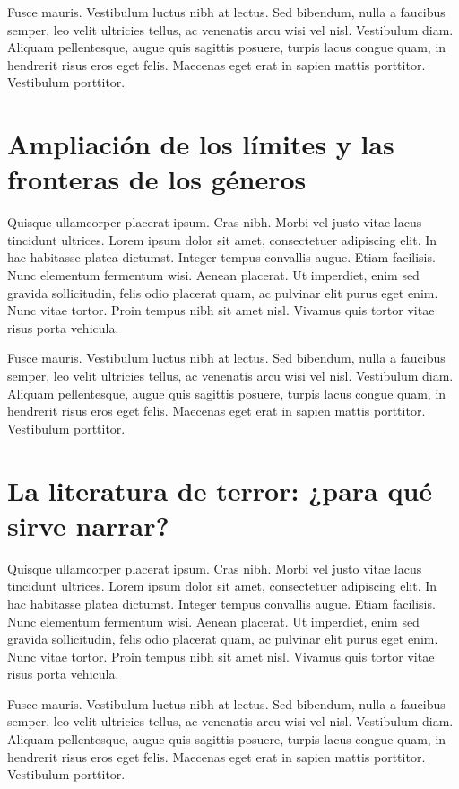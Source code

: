 Fusce mauris. Vestibulum luctus nibh at lectus. Sed bibendum, nulla a faucibus semper, leo velit ultricies tellus, ac venenatis arcu wisi vel nisl. Vestibulum diam. Aliquam pellentesque, augue quis sagittis posuere, turpis lacus congue quam, in hendrerit risus eros eget felis. Maecenas eget erat in sapien mattis porttitor. Vestibulum porttitor.

\section{Ampliación de los límites y las fronteras de los géneros}

Quisque ullamcorper placerat ipsum. Cras nibh. Morbi vel justo vitae lacus tincidunt ultrices. Lorem ipsum dolor sit amet, consectetuer adipiscing elit. In hac habitasse platea dictumst. Integer tempus convallis augue. Etiam facilisis. Nunc elementum fermentum wisi. Aenean placerat. Ut imperdiet, enim sed gravida sollicitudin, felis odio placerat quam, ac pulvinar elit purus eget enim. Nunc vitae tortor. Proin tempus nibh sit amet nisl. Vivamus quis tortor vitae risus porta vehicula.

Fusce mauris. Vestibulum luctus nibh at lectus. Sed bibendum, nulla a faucibus semper, leo velit ultricies tellus, ac venenatis arcu wisi vel nisl. Vestibulum diam. Aliquam pellentesque, augue quis sagittis posuere, turpis lacus congue quam, in hendrerit risus eros eget felis. Maecenas eget erat in sapien mattis porttitor. Vestibulum porttitor.

\section{La literatura de terror: ¿para qué sirve narrar?}

Quisque ullamcorper placerat ipsum. Cras nibh. Morbi vel justo vitae lacus tincidunt ultrices. Lorem ipsum dolor sit amet, consectetuer adipiscing elit. In hac habitasse platea dictumst. Integer tempus convallis augue. Etiam facilisis. Nunc elementum fermentum wisi. Aenean placerat. Ut imperdiet, enim sed gravida sollicitudin, felis odio placerat quam, ac pulvinar elit purus eget enim. Nunc vitae tortor. Proin tempus nibh sit amet nisl. Vivamus quis tortor vitae risus porta vehicula.

Fusce mauris. Vestibulum luctus nibh at lectus. Sed bibendum, nulla a faucibus semper, leo velit ultricies tellus, ac venenatis arcu wisi vel nisl. Vestibulum diam. Aliquam pellentesque, augue quis sagittis posuere, turpis lacus congue quam, in hendrerit risus eros eget felis. Maecenas eget erat in sapien mattis porttitor. Vestibulum porttitor.

